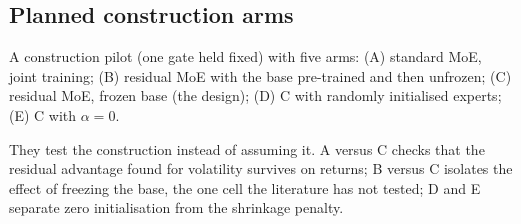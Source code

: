 \subsection{Planned construction arms}

A construction pilot (one gate held fixed) with five arms: (A) standard MoE, joint training; (B) residual
MoE with the base pre-trained and then unfrozen; (C) residual MoE, frozen base (the design); (D) C with
randomly initialised experts; (E) C with $\alpha=0$. 

\begin{whybox}
They test the construction instead of assuming it. A versus C checks that the residual advantage found
for volatility survives on returns; B versus C isolates the effect of freezing the base, the one cell
the literature has not tested; D and E separate zero initialisation from the shrinkage penalty.
\end{whybox}
